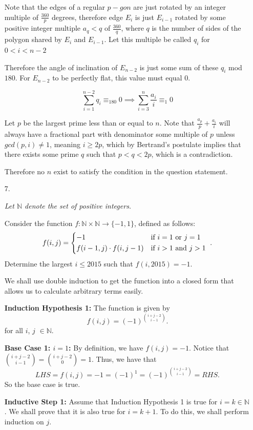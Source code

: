 \documentclass{article}
\begin{document}
\begin{enumerate}
Note that the edges of a regular $p-gon$ are just rotated by an integer multiple of $\frac{360}{p}$ degrees, therefore edge $E_i$ is just $E_{i-1}$ rotated by some positive integer multiple $a_q < q$ of $\frac{360}{q}$, where $q$ is the number of sides of the polygon shared by $E_i$ and $E_{i-1}$.
Let this multiple be called $q_i$ for $0<i<n-2$

Therefore the angle of inclination of $E_{n-2}$ is just some sum of these $q_i$ mod $180$.
For $E_{n-2}$ to be perfectly flat, this value must equal $0$.

\[ \sum_{i=1}^{n-2} q_i \equiv_{180} 0 \implies {\sum_{i=3}^{n} \frac{a_i}{i} \equiv_{1} 0} \]

Let $p$ be the largest prime less than or equal to $n$.
Note that $\frac{a_p}{p} + \frac{a_i}{i}$ will always have a fractional part with denominator some multiple of $p$ unless $gcd(p,i) \neq 1$, meaning $i \geq 2p$, which by Bertrand's postulate implies that there exists some prime $q$ such that $p < q < 2p$, which is a contradiction.

Therefore no $n$ exist to satisfy the condition in the question statement.

\medskip
\item[7.]%
{\itshape Let $\mathbb{N}$ denote the set of positive integers.

Consider the function $f : \mathbb{N} \times \mathbb{N} \to \{-1,1\}$, defined as follows:
\[ f(i,j) = \begin{dcases*} -1 & if $i = 1$ or $j = 1$ \\ f(i-1,j) \cdot f(i,j-1) & if $i > 1$ and $j > 1$ \end{dcases*}. \]
Determine the largest $i \leq 2015$ such that $f(i,2015) = -1$.}

We shall use double induction to get the function into a closed form that allows us to calculate arbitrary terms easily.

\textbf{Induction Hypothesis 1:} The function is given by
$$f(i, j) = (-1)^{\binom{i + j - 2}{i - 1}}. $$
for all $i$, $j$ $\in \mathbb{N}$.

\textbf{Base Case 1: $i = 1$:} By definition, we have $f(i, j) = -1$. Notice that $\binom{i + j - 2}{i - 1} = \binom{i + j - 2}{0} = 1$. Thus, we have that
$$LHS = f(i, j) = -1 = (-1)^1 = (-1)^{\binom{i + j - 2}{i - 1}} = RHS.$$
So the base case is true.

\textbf{Inductive Step 1:} Assume that Induction Hypothesis 1 is true for $i = k \in \mathbb{N}$. We shall prove that it is also true for $i = k + 1$. To do this, we shall perform induction on $j$.


\end{enumerate}
\end{document}
